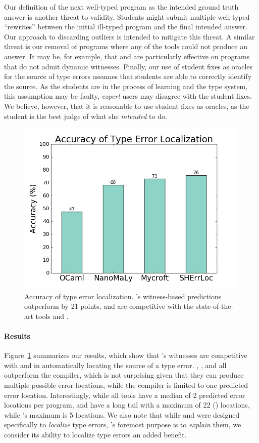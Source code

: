 Our definition of the next well-typed program as the intended ground
truth answer is another threat to validity. Students might submit
multiple well-typed ``rewrites'' between the initial ill-typed program
and the final intended answer.
%
Our approach to discarding outliers is intended to mitigate this threat.
%
A similar threat is our removal of programs where any of the tools could
not produce an answer.
%
It may be, for example, that \mycroft and \sherrloc are particularly
effective on programs that do not admit dynamic witnesses.
%
Finally, our use of student fixes as oracles for the source of type
errors assumes that students are able to correctly identify the source.
%
As the students are in the process of learning \ocaml and the type
system, this assumption may be faulty, \emph{expert} users may disagree
with the student fixes.
%
We believe, however, that it is reasonable to use student fixes as
oracles, as the student is the best judge of what she \emph{intended} to
do.

\begin{figure}[t]
\centering
\includegraphics[width=0.7\linewidth]{nanomaly/blame.png}
\caption{Accuracy of type error localization. \toolname's witness-based
  predictions outperform \ocaml by 21 points, and are competitive
  with the state-of-the-art tools \mycroft and \sherrloc.}
\label{fig:results-blame}
\end{figure}

\paragraph{Results}
Figure~\ref{fig:results-blame} summarizes our results, which show that
\toolname's witnesses are competitive with \mycroft and \sherrloc in
automatically locating the source of a type error.
%
\toolname, \mycroft, and \sherrloc all outperform the \ocaml compiler,
which is not surprising given that they can produce multiple possible
error locations, while the \ocaml compiler is limited to one predicted
error location.
%
Interestingly, while all tools have a median of 2 predicted error
locations per program, \mycroft and \sherrloc have a long tail with a
maximum of 22 () locations, while \toolname's maximum is 5
locations.
%
We also note that while \mycroft and \sherrloc were designed
specifically to \emph{localize} type errors, \toolname's foremost
purpose is to \emph{explain} them, we consider its ability to localize
type errors an added benefit.

